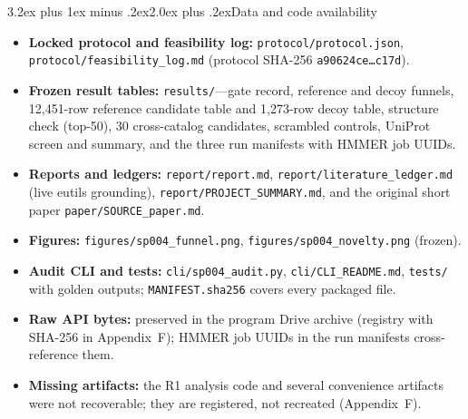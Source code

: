 \documentclass[11pt]{article}
\makeatletter
\renewcommand{\section}{\@startsection{section}{1}{\z@}%
  {3.2ex plus 1ex minus .2ex}{2.0ex plus .2ex}{\Large\bfseries\color{navy}}}
\makeatother
\begin{document}
\section{Data and code availability}
\begin{itemize}
\item \textbf{Locked protocol and feasibility log:} \texttt{protocol/protocol.json}, \texttt{protocol/feasibility\_log.md} (protocol SHA-256 \texttt{a90624ce\ldots c17d}).
\item \textbf{Frozen result tables:} \texttt{results/}---gate record, reference and decoy funnels, 12,451-row reference candidate table and 1,273-row decoy table, structure check (top-50), 30 cross-catalog candidates, scrambled controls, UniProt screen and summary, and the three run manifests with HMMER job UUIDs.
\item \textbf{Reports and ledgers:} \texttt{report/report.md}, \texttt{report/literature\_ledger.md} (live eutils grounding), \texttt{report/PROJECT\_SUMMARY.md}, and the original short paper \texttt{paper/SOURCE\_paper.md}.
\item \textbf{Figures:} \texttt{figures/sp004\_funnel.png}, \texttt{figures/sp004\_novelty.png} (frozen).
\item \textbf{Audit CLI and tests:} \texttt{cli/sp004\_audit.py}, \texttt{cli/CLI\_README.md}, \texttt{tests/} with golden outputs; \texttt{MANIFEST.sha256} covers every packaged file.
\item \textbf{Raw API bytes:} preserved in the program Drive archive (registry with SHA-256 in Appendix~F); HMMER job UUIDs in the run manifests cross-reference them.
\item \textbf{Missing artifacts:} the R1 analysis code and several convenience artifacts were not recoverable; they are registered, not recreated (Appendix~F).
\end{itemize}
\end{document}
